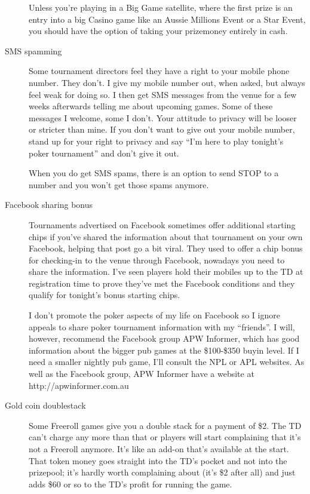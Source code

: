 \begin{description}
Unless you're playing in a Big Game satellite, where the first prize
is an entry into a big Casino game like an Aussie Millions Event or a
Star Event, you should have the option of taking your prizemoney
entirely in cash.

\item[SMS spamming] Some tournament directors feel they have a
right to your mobile phone number. They don't.
I give my mobile number out, when asked, but always feel weak
for doing so. I then get SMS messages from the venue
for a few weeks afterwards telling me about upcoming games. Some of
these messages I welcome, some I don't. Your attitude to privacy will
be looser or stricter than mine. If you don't want to give out your
mobile number, stand up for your right to privacy and say ``I'm here
to play tonight's poker tournament'' and don't give it out.

When you do get SMS spams, there is an option to send STOP to a number
and you won't get those spams anymore.

\item[Facebook sharing bonus] Tournaments advertised on Facebook sometimes
offer additional starting chips if you've shared the information
about that tournament on your own Facebook, helping that post go
a bit viral. They used to offer a chip bonus for
checking-in to the venue through Facebook, nowadays you need to share
the information. I've seen players hold their mobiles up to the TD at
registration time to prove they've met the Facebook conditions and
they qualify for tonight's bonus starting chips.

I don't promote the poker aspects of my life on Facebook so I ignore
appeals to share poker tournament information with my ``friends''. I
will, however, recommend the Facebook group APW Informer, which has
good information about the bigger pub games at the \$100-\$350 buyin
level. If I need a smaller nightly pub game, I'll consult the NPL or
APL websites. As well as the Facebook group, APW Informer have a
website at http://apwinformer.com.au

\item[Gold coin doublestack] Some Freeroll games give you a double stack
for a payment of \$2. The TD can't charge any more than that or
players will start complaining that it's not a Freeroll anymore.
It's like an add-on that's available at the start. That token
money goes straight into the TD's pocket and not into the prizepool;
it's hardly worth complaining about (it's \$2 after all) and just adds
\$60 or so to the TD's profit for running the game.


\end{description}
